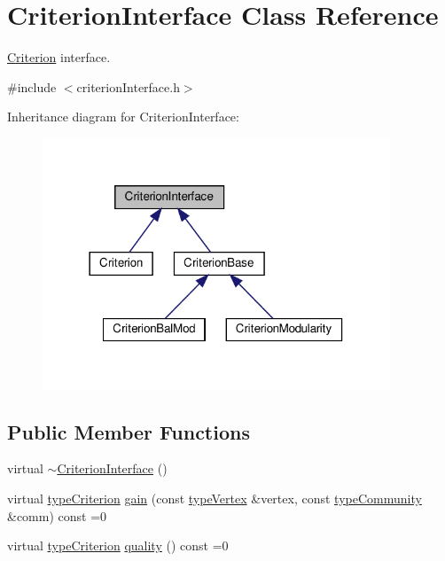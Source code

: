 \hypertarget{classCriterionInterface}{}\section{Criterion\+Interface Class Reference}
\label{classCriterionInterface}


\hyperlink{classCriterion}{Criterion} interface.  




{\ttfamily \#include $<$criterion\+Interface.\+h$>$}



Inheritance diagram for Criterion\+Interface\+:
\nopagebreak
\begin{figure}[H]
\begin{center}
\leavevmode
\includegraphics[width=294pt]{classCriterionInterface__inherit__graph}
\end{center}
\end{figure}
\subsection*{Public Member Functions}
\begin{DoxyCompactItemize}
\item 
virtual \hyperlink{classCriterionInterface_afe9cbd3c6f58b5c54828cbfdd6d9d48d}{$\sim$\+Criterion\+Interface} ()
\item 
virtual \hyperlink{criterionInterface_8h_af71ff22f6355fd69a4a62104bfd59a83}{type\+Criterion} \hyperlink{classCriterionInterface_aa0beec8287cd70e16c057e7995d0caca}{gain} (const \hyperlink{edge_8h_a5fbd20c46956d479cb10afc9855223f6}{type\+Vertex} \&vertex, const \hyperlink{graphUndirectedGroupable_8h_a914da95c9ea7f14f4b7f875c36818556}{type\+Community} \&comm) const =0
\item 
virtual \hyperlink{criterionInterface_8h_af71ff22f6355fd69a4a62104bfd59a83}{type\+Criterion} \hyperlink{classCriterionInterface_a5d287dc7755f7ce7d6a3d91f0d8fa5de}{quality} () const =0
\end{DoxyCompactItemize}


